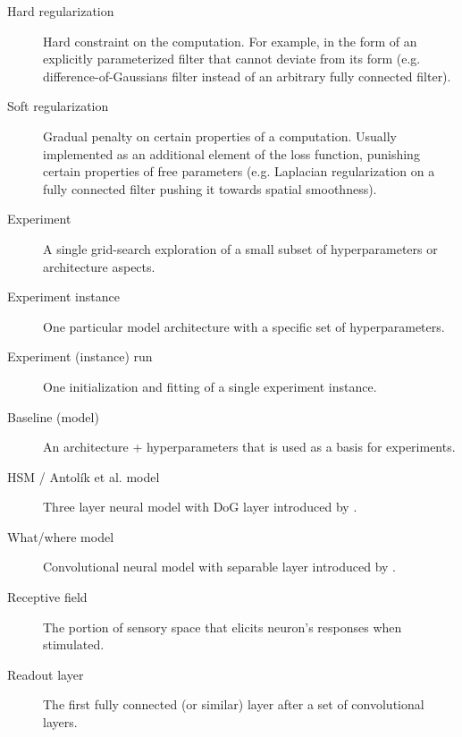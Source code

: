 
\begin{description}
	
	\item[Hard regularization]\label{glos:hard-reg} Hard constraint on the computation. For example, in the form of an explicitly parameterized filter that cannot deviate from its form (e.g. difference-of-Gaussians filter instead of an arbitrary fully connected filter).
	
	\item[Soft regularization]\label{glos:soft-reg} Gradual penalty on certain properties of a computation. Usually implemented as an additional element of the loss function, punishing certain properties of free parameters (e.g. Laplacian regularization on a fully connected filter pushing it towards spatial smoothness).
	
	\item[Experiment] A single grid-search exploration of a small subset of hyperparameters or architecture aspects.
	
	\item[Experiment instance] One particular model architecture with a specific set of hyperparameters.
	
	\item[Experiment (instance) run] One initialization and fitting of a single experiment instance.
	
	\item[Baseline (model)] An architecture + hyperparameters that is used as a basis for experiments.
	
	\item[HSM / Antolík et al. model] Three layer neural model with DoG layer introduced by \cite{antolik}.

	\item[What/where model] Convolutional neural model with separable layer introduced by \cite{klindt}.

	\item[Receptive field] The portion of sensory space that elicits neuron’s responses when stimulated.

	\item[Readout layer] The first fully connected (or similar) layer after a set of convolutional layers.

\end{description}

